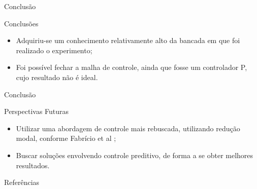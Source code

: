 \documentclass[10pt]{beamer}
\begin{document}
\begin{frame}[fragile]{Conclusão}
\begin{block}{Conclusões}
\begin{itemize}
	\item Adquiriu-se um conhecimento relativamente alto da bancada em que foi realizado o experimento;
	\item Foi possível fechar a malha de controle, ainda que fosse um controlador P, cujo resultado não é ideal.
\end{itemize}
\end{block}
\end{frame}

\begin{frame}[fragile]{Conclusão}
\begin{block}{Perspectivas Futuras}
\begin{itemize}
	\item Utilizar uma abordagem de controle mais rebuscada, utilizando redução modal, conforme Fabrício et al \cite{fabricioIFAC};
	\item Buscar soluções envolvendo controle preditivo, de forma a se obter melhores resultados.
\end{itemize}
\end{block}
\end{frame}

%
%
%
%
%


\begin{frame}[allowframebreaks]{Referências}

  
  

\end{frame}

\end{document}
